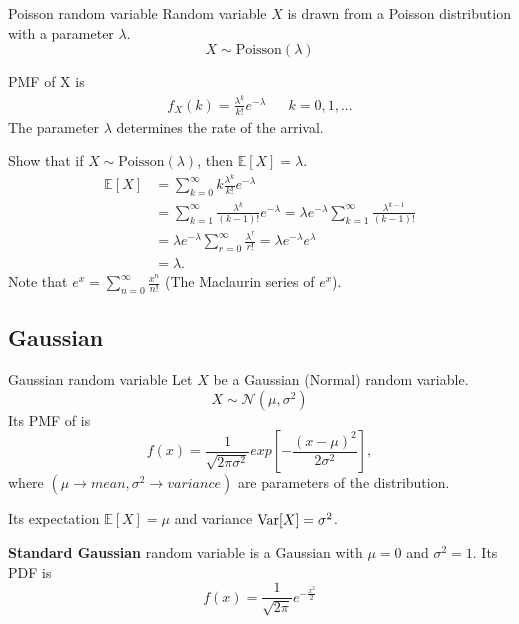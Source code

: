 \begin{fact}{Poisson random variable}{}
  Random variable $X$ is drawn from a Poisson distribution with a parameter $\lambda$.
  \begin{equation*}
      X \sim \text{Poisson}(\lambda)
  \end{equation*}

  PMF of X is
  \begin{align*}
    f_X(k) =  \frac{\lambda^k}{k!}e^{-\lambda} && k = 0,1,...
  \end{align*}
  The parameter $\lambda$ determines the rate of the arrival.
\end{fact}

\begin{exec}
  Show that if $X\sim \text{Poisson}(\lambda)$, then $\mathbb{E}[X]=\lambda$.
  \tcblower
  \begin{align*}
    \mathbb{E}[X]
    &= \sum_{k=0}^{\infty} k\frac{\lambda^k}{k!}e^{-\lambda}\\
    &= \sum_{k=1}^{\infty}\frac{\lambda^k}{(k-1)!}e^{-\lambda} = \lambda e^{-\lambda}\sum_{k=1}^{\infty}\frac{\lambda^{k-1}}{(k-1)!}\\
    &= \lambda e^{-\lambda}\sum_{r=0}^{\infty}\frac{\lambda^{r}}{r!} = \lambda e^{-\lambda}e^{\lambda}\\
    &= \lambda.
  \end{align*}
  Note that $e^x=\sum_{n=0}^{\infty}\frac{x^n}{n!}$ (The Maclaurin series of $e^x$).
\end{exec}

\subsection{Gaussian}

\begin{fact}{Gaussian random variable}{}
  Let $X$ be a Gaussian (Normal) random variable.
  \begin{equation*}
      X \sim \mathcal{N}(\mu,\sigma^2)
  \end{equation*}
  Its PMF of is
  \begin{equation*}
    f(x)=\frac{1}{\sqrt{2\pi\sigma^2}}exp\left[-\frac{(x-\mu)^2}{2\sigma^2}\right],
  \end{equation*}
  where $(\mu\rightarrow mean,\sigma^2\rightarrow variance)$ are parameters of the distribution.

  Its expectation $\mathbb{E}[X]=\mu$ and variance $\mathrm{Var}[X]=\sigma^2$.

  \textbf{Standard Gaussian} random variable is a Gaussian with $\mu=0$ and $\sigma^2=1$. Its PDF is
  \begin{equation*}
    f(x)=\frac{1}{\sqrt{2\pi}}e^{-\frac{x^2}{2}}
  \end{equation*}
\end{fact}

